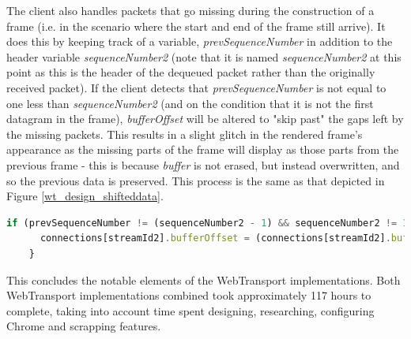 The client also handles packets that go missing during the construction of a frame (i.e. in the scenario where the start and end of the frame still arrive). It does this by keeping track of a variable, \textit{prevSequenceNumber} in addition to the header variable \textit{sequenceNumber2} (note that it is named \textit{sequenceNumber2} at this point as this is the header of the dequeued packet rather than the originally received packet). If the client detects that \textit{prevSequenceNumber} is not equal to one less than \textit{sequenceNumber2} (and on the condition that it is not the first datagram in the frame), \textit{bufferOffset} will be altered to "skip past" the gaps left by the missing packets. This results in a slight glitch in the rendered frame's appearance as the missing parts of the frame will display as those parts from the previous frame - this is because \textit{buffer} is not erased, but instead overwritten, and so the previous data is preserved. This process is the same as that depicted in Figure \ref{wt_design_shifteddata}. 

\begin{lstlisting}[language=javascript, caption={Datagrams build's client handling lost datagrams.}, label=lst:callahan]
    if (prevSequenceNumber != (sequenceNumber2 - 1) && sequenceNumber2 != 1) {
      connections[streamId2].bufferOffset = (connections[streamId2].bufferOffset + dataSize*(sequenceNumber2-prevSequenceNumber)-dataSize);
    }
\end{lstlisting}

This concludes the notable elements of the WebTransport implementations. Both WebTransport implementations combined took approximately 117 hours to complete, taking into account time spent designing, researching, configuring Chrome and scrapping features.





